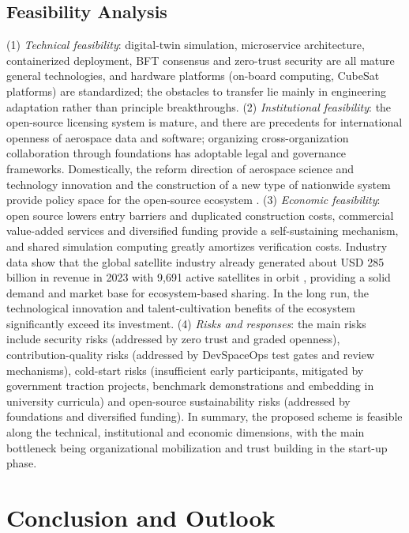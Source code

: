 \documentclass[11pt]{article}
\begin{document}
\subsection{Feasibility Analysis}
(1) \emph{Technical feasibility}: digital-twin simulation, microservice architecture, containerized deployment, BFT consensus and zero-trust security are all mature general technologies, and hardware platforms (on-board computing, CubeSat platforms) are standardized; the obstacles to transfer lie mainly in engineering adaptation rather than principle breakthroughs. (2) \emph{Institutional feasibility}: the open-source licensing system is mature, and there are precedents for international openness of aerospace data and software; organizing cross-organization collaboration through foundations has adoptable legal and governance frameworks. Domestically, the reform direction of aerospace science and technology innovation and the construction of a new type of nationwide system provide policy space for the open-source ecosystem \cite{white2021}. (3) \emph{Economic feasibility}: open source lowers entry barriers and duplicated construction costs, commercial value-added services and diversified funding provide a self-sustaining mechanism, and shared simulation computing greatly amortizes verification costs. Industry data show that the global satellite industry already generated about USD 285 billion in revenue in 2023 with 9,691 active satellites in orbit \cite{sia2024}, providing a solid demand and market base for ecosystem-based sharing. In the long run, the technological innovation and talent-cultivation benefits of the ecosystem significantly exceed its investment. (4) \emph{Risks and responses}: the main risks include security risks (addressed by zero trust and graded openness), contribution-quality risks (addressed by DevSpaceOps test gates and review mechanisms), cold-start risks (insufficient early participants, mitigated by government traction projects, benchmark demonstrations and embedding in university curricula) and open-source sustainability risks (addressed by foundations and diversified funding). In summary, the proposed scheme is feasible along the technical, institutional and economic dimensions, with the main bottleneck being organizational mobilization and trust building in the start-up phase.

\section{Conclusion and Outlook}
\end{document}
